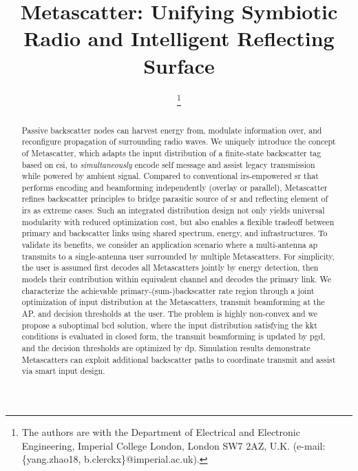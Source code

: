 \documentclass[journal]{IEEEtran}
\begin{document}
\title{Metascatter: Unifying Symbiotic Radio and Intelligent Reflecting Surface}
\author{
	\thanks{
		The authors are with the Department of Electrical and Electronic Engineering, Imperial College London, London SW7 2AZ, U.K. (e-mail: \{yang.zhao18, b.clerckx\}@imperial.ac.uk).
	}
}
\maketitle

\begin{abstract}
	Passive backscatter nodes can harvest energy from, modulate information over, and reconfigure propagation of surrounding radio waves.
	We uniquely introduce the concept of Metascatter, which adapts the input distribution of a finite-state backscatter tag based on \gls{csi}, to \emph{simultaneously} encode self message and assist legacy transmission while powered by ambient signal.
	Compared to conventional \gls{irs}-empowered \gls{sr} that performs encoding and beamforming independently (overlay or parallel), Metascatter refines backscatter principles to bridge parasitic source of \gls{sr} and reflecting element of \gls{irs} as extreme cases.
	Such an integrated distribution design not only yields universal modularity with reduced optimization cost, but also enables a flexible tradeoff between primary and backscatter links using shared spectrum, energy, and infrastructures.
	To validate its benefits, we consider an application scenario where a multi-antenna \gls{ap} transmits to a single-antenna user surrounded by multiple Metascatters.
	For simplicity, the user is assumed first decodes all Metascatters jointly by energy detection, then models their contribution within equivalent channel and decodes the primary link.
	We characterize the achievable primary-(sum-)backscatter rate region through a joint optimization of input distribution at the Metascatters, transmit beamforming at the AP, and decision thresholds at the user.
	The problem is highly non-convex and we propose a suboptimal \gls{bcd} solution, where the input distribution satisfying the \gls{kkt} conditions is evaluated in closed form, the transmit beamforming is updated by \gls{pgd}, and the decision thresholds are optimized by \gls{dp}.
	Simulation results demonstrate Metascatters can exploit additional backscatter paths to coordinate transmit and assist via smart input design.
\end{abstract}
\end{document}

